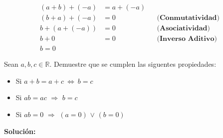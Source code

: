 \documentclass[12pt]{book}
\begin{document}
\begin{align*}
    (a+b)+(-a)&=a+(-a) \\
    (b+a)+(-a)&=0  && \textbf{(Conmutatividad)} \\
    b+ (a+(-a))&=0 && \textbf{(Asociatividad)} \\
    b+0&=0 && \textbf{(Inverso Aditivo)} \\
    b=0
\end{align*}

\begin{prob}
\quad \quad
    Sean $a,b,c \in \mathbb{R}$. Demuestre que se cumplen las siguentes propiedades:

    \begin{itemize}
        \item[\textbf{a)}] Si $a+b=a+c  \ \Longleftrightarrow\ b=c$
        \item[\textbf{b)}] Si $ab =ac$ $\Longrightarrow$ $b=c$
        \item[\textbf{c)}] Si $ab=0$ $\Longrightarrow$ $(a=0)$ $\vee$ $(b=0)$
    \end{itemize}
\end{prob}
\textbf{Solución:}
\end{document}

